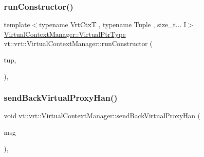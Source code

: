 \subsubsection{\texorpdfstring{run\+Constructor()}{runConstructor()}}
{\footnotesize\ttfamily template$<$typename Vrt\+CtxT , typename Tuple , size\+\_\+t... I$>$ \\
\hyperlink{structvt_1_1vrt_1_1_virtual_context_manager_a24dd2acbbd37a53f4e4108d385a58441}{Virtual\+Context\+Manager\+::\+Virtual\+Ptr\+Type} vt\+::vrt\+::\+Virtual\+Context\+Manager\+::run\+Constructor (\begin{DoxyParamCaption}\item[{Tuple $\ast$}]{tup,  }\item[{std\+::index\+\_\+sequence$<$ I... $>$}]{ }\end{DoxyParamCaption})\hspace{0.3cm}{\ttfamily [static]}, {\ttfamily [private]}}

\mbox{\label{structvt_1_1vrt_1_1_virtual_context_manager_aafefc0c35c19338d87f145999c13e011}} 
\subsubsection{\texorpdfstring{send\+Back\+Virtual\+Proxy\+Han()}{sendBackVirtualProxyHan()}}
{\footnotesize\ttfamily void vt\+::vrt\+::\+Virtual\+Context\+Manager\+::send\+Back\+Virtual\+Proxy\+Han (\begin{DoxyParamCaption}\item[{\hyperlink{structvt_1_1vrt_1_1_virtual_proxy_request_msg}{Virtual\+Proxy\+Request\+Msg} $\ast$}]{msg }\end{DoxyParamCaption})\hspace{0.3cm}{\ttfamily [static]}, {\ttfamily [private]}}

\mbox{\label{structvt_1_1vrt_1_1_virtual_context_manager_a0e2611d1a11ebdaa50f7e2d69332039d}} 
